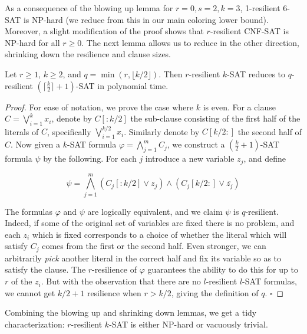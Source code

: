 \documentclass{llncs}
\begin{document}
As a consequence of the blowing up lemma for $r=0, s=2, k=3$, 1-resilient 6-SAT
is NP-hard (we reduce from this in our main coloring lower bound). Moreover, a
slight modification of the proof shows that $r$-resilient CNF-SAT is NP-hard
for all $r \geq 0$. The next lemma allows us to reduce in the other direction,
shrinking down the resilience and clause sizes.

\begin{lemma}
\label{lemma:down}
Let $r \geq 1$,  $k \geq 2$, and $q = \min(r, \lfloor k/2 \rfloor)$. Then
$r$-resilient $k$-SAT reduces to $q$-resilient $(\lceil \frac{k}{2} \rceil +
1)$-SAT in polynomial time.

\end{lemma}
\begin{proof}

For ease of notation, we prove the case where $k$ is even. For a clause $C =
\bigvee_{i=1}^k x_i$, denote by $C[:k/2]$ the sub-clause consisting of the
first half of the literals of $C$, specifically $\bigvee_{i=1}^{k/2} x_i$.
Similarly denote by $C[k/2:]$ the second half of $C$. Now given a $k$-SAT
formula $\varphi = \bigwedge_{j=1}^m C_j$, we construct a $(\frac{k}{2} +
1)$-SAT formula $\psi$ by the following. For each $j$ introduce a new variable
$z_j$, and  define

\[
   \psi = \bigwedge_{j=1}^m (C_j[:k/2] \vee z_j) \wedge (C_j[k/2:] \vee
\overline{z_j}) 
\]

The formulas $\varphi$ and $\psi$ are logically equivalent, and we claim $\psi$
is $q$-resilient. Indeed, if some of the original set of variables are fixed
there is no problem, and each $z_i$ which is fixed corresponds to a choice of
whether the literal which will satisfy $C_j$ comes from the first or the second
half. Even stronger, we can arbitrarily \emph{pick} another literal in the
correct half and fix its variable so as to satisfy the clause. The
$r$-resilience of $\varphi$ guarantees the ability to do this for up to $r$ of
the $z_i$. But with the observation that there are no $l$-resilient $l$-SAT
formulas, we cannot get $k/2 + 1$ resilience when $r > k/2$,
giving the definition of $q$.
\hfill $\square$
\end{proof}

Combining the blowing up and shrinking down lemmas, we get a tidy
characterization: $r$-resilient $k$-SAT is either NP-hard or vacuously trivial.
\end{document}
